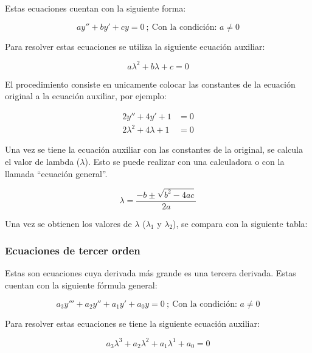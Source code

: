 Estas ecuaciones cuentan con la siguiente forma:

\begin{equation}\label{eq:forma_seg}
    ay'' + by' + cy = 0 \ ; \ \text{Con la condición: } a \neq 0
\end{equation}

Para resolver estas ecuaciones se utiliza la siguiente ecuación auxiliar:

\begin{equation}\label{eq:aux_seg}
    a \lambda^{2} + b \lambda + c = 0
\end{equation}

El procedimiento consiste en unicamente colocar las constantes de la ecuación original a la ecuación auxiliar, por ejemplo:

\begin{align*}
    2y'' + 4y' + 1 &= 0
    \\
    2 \lambda^{2} + 4 \lambda + 1 &= 0
\end{align*}

Una vez se tiene la ecuación auxiliar con las constantes de la original, se calcula el valor de lambda ($\lambda$). Esto se puede realizar con una calculadora o con la llamada ``ecuación general''.

\begin{equation*}
    \lambda = \frac{-b \pm \sqrt{b^{2}-4ac}}{2a}
\end{equation*}

Una vez se obtienen los valores de $\lambda$ ($\lambda_{1}$ y $\lambda_{2}$), se compara con la siguiente tabla:

    

\subsubsection{Ecuaciones de tercer orden}

Estas son ecuaciones cuya derivada más grande es una tercera derivada. Estas cuentan con la siguiente fórmula general:

\begin{equation}\label{eq:forma_tercer}
    a_{3}y''' + a_{2}y'' + a_{1}y' + a_{0}y = 0 \ ; \ \text{Con la condición: } a \neq 0
\end{equation}

Para resolver estas ecuaciones se tiene la siguiente ecuación auxiliar:

\begin{equation}\label{eq:aux_tercer}
    a_{3}\lambda^{3} + a_{2}\lambda^{2} + a_{1}\lambda^{1} + a_{0} = 0
\end{equation}

